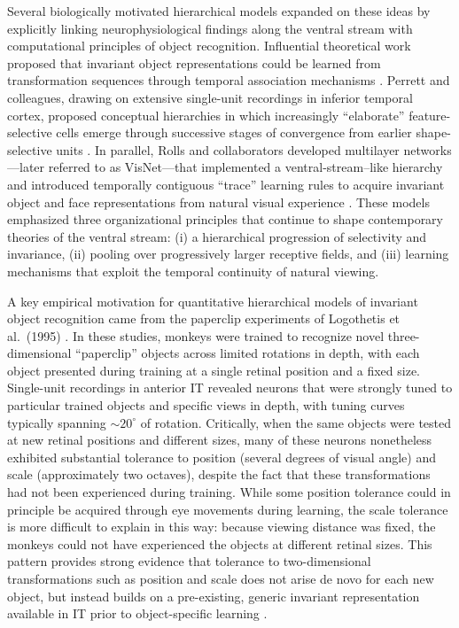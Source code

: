 \documentclass[11pt,a4paper]{article}
\begin{document}
Several biologically motivated hierarchical models expanded on these ideas by explicitly linking neurophysiological findings along the ventral stream with computational principles of object recognition. Influential theoretical work proposed that invariant object representations could be learned from transformation sequences through temporal association mechanisms \citep{Foldiak1991,PoggioEdelman1990}. Perrett and colleagues, drawing on extensive single-unit recordings in inferior temporal cortex, proposed conceptual hierarchies in which increasingly ``elaborate'' feature-selective cells emerge through successive stages of convergence from earlier shape-selective units \citep{PerrettOram1993,Tanaka1996}. In parallel, Rolls and collaborators developed multilayer networks---later referred to as VisNet---that implemented a ventral-stream--like hierarchy and introduced temporally contiguous ``trace'' learning rules to acquire invariant object and face representations from natural visual experience \citep{WallisRolls1997,Rolls2012}. These models emphasized three organizational principles that continue to shape contemporary theories of the ventral stream: (i) a hierarchical progression of selectivity and invariance, (ii) pooling over progressively larger receptive fields, and (iii) learning mechanisms that exploit the temporal continuity of natural viewing.

A key empirical motivation for quantitative hierarchical models of invariant object recognition came from the paperclip experiments of Logothetis et al.\ (1995) \citep{Logothetis1995}. In these studies, monkeys were trained to recognize novel three-dimensional ``paperclip'' objects across limited rotations in depth, with each object presented during training at a single retinal position and a fixed size. Single-unit recordings in anterior IT revealed neurons that were strongly tuned to particular trained objects and specific views in depth, with tuning curves typically spanning $\sim20^\circ$ of rotation. Critically, when the same objects were tested at new retinal positions and different sizes, many of these neurons nonetheless exhibited substantial tolerance to position (several degrees of visual angle) and scale (approximately two octaves), despite the fact that these transformations had not been experienced during training. While some position tolerance could in principle be acquired through eye movements during learning, the scale tolerance is more difficult to explain in this way: because viewing distance was fixed, the monkeys could not have experienced the objects at different retinal sizes. This pattern provides strong evidence that tolerance to two-dimensional transformations such as position and scale does not arise de novo for each new object, but instead builds on a pre-existing, generic invariant representation available in IT prior to object-specific learning \citep{LogothetisSheinberg1996}.
\end{document}
